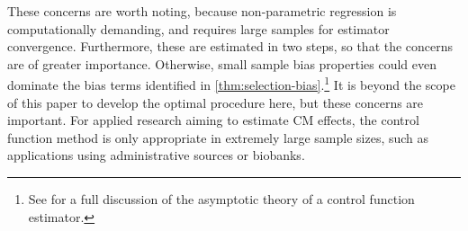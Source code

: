 These concerns are worth noting, because non-parametric regression is computationally demanding, and requires large samples for estimator convergence. 
Furthermore, these are estimated in two steps, so that the concerns are of greater importance.
Otherwise, small sample bias properties could even dominate the bias terms identified in \autoref{thm:selection-bias}.\footnote{
    See \cite[Section~6]{imbens2009identification} for a full discussion of the asymptotic theory of a control function estimator.
}
It is beyond the scope of this paper to develop the optimal procedure here, but these concerns are important.
For applied research aiming to estimate CM effects, the control function method is only appropriate in extremely large sample sizes, such as applications using administrative sources or biobanks.

